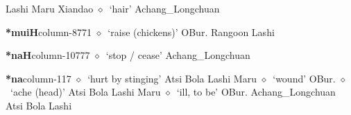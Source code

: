          Lashi 
\hspace{1ex}
         Maru 
\hspace{1ex}
         Xiandao 
\hspace{1ex}
         $\diamond$~`hair'
         Achang\_Longchuan 
  \item {\footnotesize \textbf{*muiH}}{\tiny column-8771}
         $\diamond$~`raise (chickens)'
         OBur. 
\hspace{1ex}
         Rangoon 
\hspace{1ex}
         Lashi 
  \item {\footnotesize \textbf{*naH}}{\tiny column-10777}
         $\diamond$~`stop / cease'
         Achang\_Longchuan 
  \item {\footnotesize \textbf{*na}}{\tiny column-117}
         $\diamond$~`hurt by stinging'
         Atsi 
\hspace{1ex}
         Bola 
\hspace{1ex}
         Lashi 
\hspace{1ex}
         Maru 
\hspace{1ex}
         $\diamond$~`wound'
         OBur. 
\hspace{1ex}
         $\diamond$~`ache (head)'
         Atsi 
\hspace{1ex}
         Bola 
\hspace{1ex}
         Lashi 
\hspace{1ex}
         Maru 
\hspace{1ex}
         $\diamond$~`ill, to be'
         OBur. 
\hspace{1ex}
         Achang\_Longchuan 
\hspace{1ex}
         Atsi 
\hspace{1ex}
         Bola 
\hspace{1ex}
         Lashi 
\hspace{1ex}
